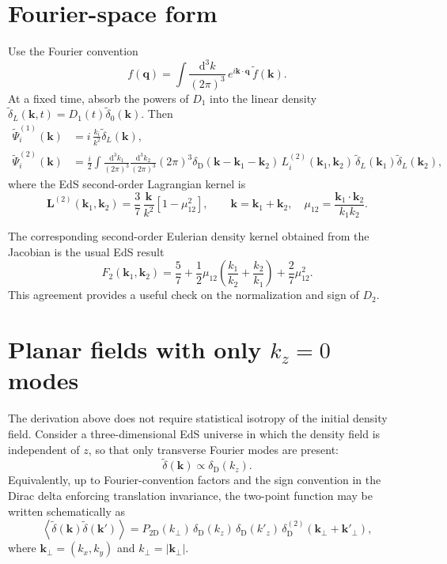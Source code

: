 \documentclass[11pt]{article}
\newcommand{\dd}{\mathrm{d}}
\newcommand{\qv}{\bm{q}}
\newcommand{\kv}{\bm{k}}
\newcommand{\kone}{\bm{k}_1}
\newcommand{\ktwo}{\bm{k}_2}
\newcommand{\delD}{\delta_{\mathrm{D}}}
\begin{document}
\section{Fourier-space form}

Use the Fourier convention
\begin{equation}
  f(\qv)
  =
  \int\frac{\dd^3k}{(2\pi)^3}\,
  e^{i\kv\cdot\qv}\,\tilde f(\kv).
\end{equation}
At a fixed time, absorb the powers of $D_1$ into the linear density
$\tilde\delta_L(\kv,t)=D_1(t)\tilde\delta_0(\kv)$.  Then
\begin{align}
  \tilde\Psi^{(1)}_i(\kv)
  &=
  i\,\frac{k_i}{k^2}\tilde\delta_L(\kv),\\
  \tilde\Psi^{(2)}_i(\kv)
  &=
  \frac{i}{2}
  \int\frac{\dd^3k_1}{(2\pi)^3}
       \frac{\dd^3k_2}{(2\pi)^3}
  (2\pi)^3\delD(\kv-\kone-\ktwo)\,
  L^{(2)}_i(\kone,\ktwo)\,
  \tilde\delta_L(\kone)\tilde\delta_L(\ktwo),
\end{align}
where the EdS second-order Lagrangian kernel is
\begin{equation}
  \boxed{
  \bm{L}^{(2)}(\kone,\ktwo)
  =
  \frac{3}{7}\,
  \frac{\kv}{k^2}
  \left[1-\mu_{12}^2\right]
  },
  \qquad
  \kv=\kone+\ktwo,\quad
  \mu_{12}=\frac{\kone\cdot\ktwo}{k_1k_2}.
\end{equation}

The corresponding second-order Eulerian density kernel obtained from the
Jacobian is the usual EdS result
\begin{equation}
  F_2(\kone,\ktwo)
  =
  \frac{5}{7}
  +\frac{1}{2}\mu_{12}
    \left(\frac{k_1}{k_2}+\frac{k_2}{k_1}\right)
  +\frac{2}{7}\mu_{12}^2.
\end{equation}
This agreement provides a useful check on the normalization and sign of
$D_2$.

\section{Planar fields with only \texorpdfstring{$k_z=0$}{kz = 0} modes}

The derivation above does not require statistical isotropy of the initial
density field.  Consider a three-dimensional EdS universe in which the density
field is independent of $z$, so that only transverse Fourier modes are present:
\begin{equation}
  \tilde\delta(\kv)
  \propto \delD(k_z).
\end{equation}
Equivalently, up to Fourier-convention factors and the sign convention in the
Dirac delta enforcing translation invariance, the two-point function may be
written schematically as
\begin{equation}
  \left\langle
    \tilde\delta(\kv)\tilde\delta(\kv')
  \right\rangle
  =
  P_{\mathrm{2D}}(k_\perp)\,
  \delD(k_z)\,\delD(k'_z)\,
  \delD^{(2)}(\kv_\perp+\kv'_\perp),
\end{equation}
where $\kv_\perp=(k_x,k_y)$ and $k_\perp=|\kv_\perp|$.
\end{document}
